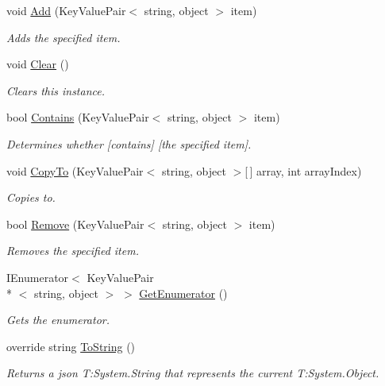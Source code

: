 \begin{DoxyCompactItemize}
void \hyperlink{class_accela_1_1_windows_store_s_d_k_1_1_json_object_ad557f1538d18a915d7567eaf8d47b068}{Add} (Key\+Value\+Pair$<$ string, object $>$ item)
\begin{DoxyCompactList}\small\item\em Adds the specified item. \end{DoxyCompactList}\item 
void \hyperlink{class_accela_1_1_windows_store_s_d_k_1_1_json_object_af703ad6f6b61aca64a94b66a54c0cd29}{Clear} ()
\begin{DoxyCompactList}\small\item\em Clears this instance. \end{DoxyCompactList}\item 
bool \hyperlink{class_accela_1_1_windows_store_s_d_k_1_1_json_object_a535981fd41bff5fd7d71bff19317be09}{Contains} (Key\+Value\+Pair$<$ string, object $>$ item)
\begin{DoxyCompactList}\small\item\em Determines whether \mbox{[}contains\mbox{]} \mbox{[}the specified item\mbox{]}. \end{DoxyCompactList}\item 
void \hyperlink{class_accela_1_1_windows_store_s_d_k_1_1_json_object_aad194e69a76ace4ad0d258ad3ae75199}{Copy\+To} (Key\+Value\+Pair$<$ string, object $>$\mbox{[}$\,$\mbox{]} array, int array\+Index)
\begin{DoxyCompactList}\small\item\em Copies to. \end{DoxyCompactList}\item 
bool \hyperlink{class_accela_1_1_windows_store_s_d_k_1_1_json_object_ade8aa1a96f5287ae88e62f81223d58a3}{Remove} (Key\+Value\+Pair$<$ string, object $>$ item)
\begin{DoxyCompactList}\small\item\em Removes the specified item. \end{DoxyCompactList}\item 
I\+Enumerator$<$ Key\+Value\+Pair\\*
$<$ string, object $>$ $>$ \hyperlink{class_accela_1_1_windows_store_s_d_k_1_1_json_object_a3617d26c7a2fd7b404a587184bc05baf}{Get\+Enumerator} ()
\begin{DoxyCompactList}\small\item\em Gets the enumerator. \end{DoxyCompactList}\item 
override string \hyperlink{class_accela_1_1_windows_store_s_d_k_1_1_json_object_a493416ef359e48d5b811d9845b074d3c}{To\+String} ()
\begin{DoxyCompactList}\small\item\em Returns a json T\+:\+System.\+String that represents the current T\+:\+System.\+Object. \end{DoxyCompactList}\end{DoxyCompactItemize}
